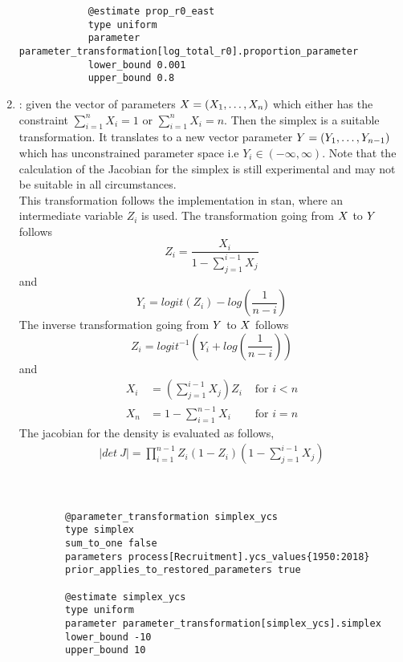 \begin{enumerate}
{{\begin{verbatim}
			@estimate prop_r0_east
			type uniform
			parameter parameter_transformation[log_total_r0].proportion_parameter
			lower_bound 0.001
			upper_bound 0.8		
\end{verbatim}}}

\item {} : given the vector of parameters $\boldmath{X} = (X_1, \dots, X_n)$ which either has the constraint $\sum_{i = 1}^n X_i = 1$ or $\sum_{i = 1}^n X_i = n$. Then the simplex is a suitable transformation. It translates to a new vector parameter \(\boldmath{Y} = (Y_1, \dots, Y_{n - 1})\) which has unconstrained parameter space i.e \(Y_i \in (-\infty, \infty)\). Note that the calculation of the Jacobian for the simplex is still experimental and may not be suitable in all circumstances.\\

This transformation follows the implementation in stan, where an intermediate variable \(Z_i\) is used. The transformation going from $\boldmath{X}$ to $\boldmath{Y}$ follows\\
\[
Z_i = \frac{X_i}{1 - \sum_{j = 1}^{i - 1}X_j}
\]
and 
\[
Y_i = logit(Z_i) - log\left(\frac{1}{n -i}\right)
\]
The inverse transformation going from $\boldmath{Y}$ to $\boldmath{X}$ follows
\[
Z_i = logit^{-1}\left(Y_i +  log\left(\frac{1}{n -i}\right)\right)
\]
and
\begin{align*}
	X_i &= \left( \sum_{j = 1}^{i - 1}X_j\right)Z_i & \text{ for } i < n\\
	X_n &= 1 - \sum_{i = 1}^{n - 1} X_i & \text{ for } i = n
\end{align*}
The jacobian for the density is evaluated as follows,
\begin{align*}
|det \ J| = \prod_{i = 1}^{n - 1} Z_i \left(1 - Z_i\right) \left(1 - \sum_{j = 1}^{i - 1}X_j\right)
\end{align*}
\\
\\
\label{sec:Transformation-Simplex}
{\small{\begin{verbatim}
		@parameter_transformation simplex_ycs
		type simplex
		sum_to_one false
		parameters process[Recruitment].ycs_values{1950:2018}
		prior_applies_to_restored_parameters true
		
		@estimate simplex_ycs
		type uniform
		parameter parameter_transformation[simplex_ycs].simplex
		lower_bound -10
		upper_bound 10


\end{verbatim}}}
\end{enumerate}
